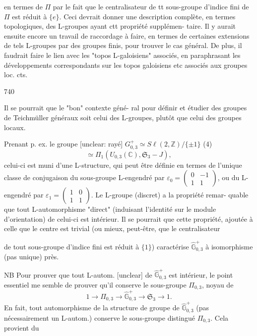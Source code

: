 \newpage


en termes de $\Pi$ par le fait que
le centralisateur de tt sous-groupe
d'indice fini de $\Pi$ est réduit à $\{e\}$.
Ceci devrait donner une description
complète, en termes topologiques, des
L-groupes ayant ctt propriété supplémen-
taire. Il y aurait ensuite encore
un travail de raccordage à faire,
en termes de certaines extensions de
tels L-groupes par des groupes finis,
pour trouver le cas général. De
plus, il faudrait faire le lien
avec les "topos L-galoisiens" associés,
en paraphrasant les développements
correspondants sur les topos galoisiens etc
associés aux groupes loc. cts.

\newpage


740

Il se pourrait que le "bon" contexte géné-
ral pour définir et étudier des groupes
de Teichmüller généraux soit celui
des L-groupes, plutôt que celui des
groupes locaux.

Prenant p. ex. le groupe 
[unclear: rayé] $G^+_{0,3} \simeq S\ell(2, \mathbb{Z}) / \{ \pm 1 \}$
(4) $$ \simeq \Pi_1( U_{0,3}(\mathbb{C}), \mathfrak{S}_3 - J ),$$
celui-ci est muni d'une L-structure,
qui peut être définie en termes de
l'unique classe de conjugaison du
sous-groupe L-engendré par $\varepsilon_0 = \begin{pmatrix} 0 & -1 \\ 1 & 1 \end{pmatrix}$,
ou du L-engendré par $\varepsilon_1 = \begin{pmatrix} 1 & 0 \\ 1 & 1 \end{pmatrix}$.
Le L-groupe (discret) a la propriété remar-
quable que tout L-automorphisme
"direct" (induisant l'identité sur le module d'orientation)
de celui-ci est intérieur. Il se
pourrait que cette propriété, ajoutée à
celle que le centre est trivial (ou
mieux, peut-être, que le centralisateur

\newpage


de tout sous-groupe d'indice fini est
réduit à $\{1\}$) caractérise $\widehat{\mathbb{G}}_{0,3}^+$ à
isomorphisme (pas unique) près.

NB Pour prouver que tout L-autom.
[unclear] de $\widehat{\mathbb{G}}_{0,3}^+$ est intérieur, le
point essentiel me semble de prouver
qu'il conserve le sous-groupe
$\Pi_{0,3}$, noyau de
$$1 \to \Pi_{0,3} \to \widehat{\mathbb{G}}_{0,3}^+ \to \mathfrak{S}_3 \to 1.$$
En fait, tout automorphisme de
la structure de groupe de $\widehat{\mathbb{G}}_{0,3}^+$
(pas nécessairement un L-autom.)
conserve le sous-groupe distingué
$\Pi_{0,3}$. Cela provient du

